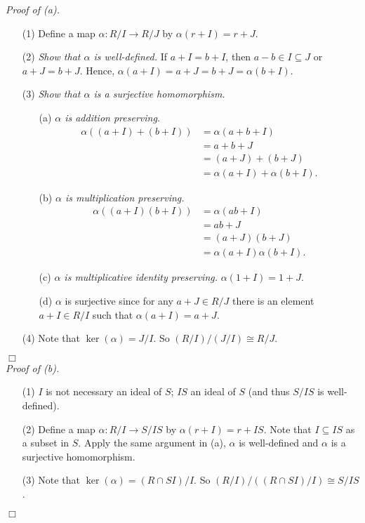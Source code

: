 \documentclass{article}
\begin{document}
\emph{Proof of (a).}
\begin{enumerate}
\item[(1)]
  Define a map $\alpha: R/I \to R/J$ by $\alpha(r + I) = r + J$.

\item[(2)]
  \emph{Show that $\alpha$ is well-defined.}
  If $a+I = b+I$,
  then $a-b \in I \subseteq J$ or $a+J = b+J$.
  Hence, $\alpha(a+I) = a+J = b+J = \alpha(b+I)$.

\item[(3)]
  \emph{Show that $\alpha$ is a surjective homomorphism.}
  \begin{enumerate}
  \item[(a)]
    \emph{$\alpha$ is addition preserving.}
    \begin{align*}
      \alpha((a+I) + (b+I))
      &= \alpha(a+b + I) \\
      &= a+b + J \\
      &= (a+J) + (b+J) \\
      &= \alpha(a+I) + \alpha(b+I).
    \end{align*}

  \item[(b)]
    \emph{$\alpha$ is multiplication preserving.}
    \begin{align*}
      \alpha((a+I)(b+I))
      &= \alpha(ab + I) \\
      &= ab + J \\
      &= (a+J)(b+J) \\
      &= \alpha(a+I)\alpha(b+I).
    \end{align*}

  \item[(c)]
    \emph{$\alpha$ is multiplicative identity preserving.}
    $\alpha(1+I) = 1+J$.

  \item[(d)]
    $\alpha$ is surjective since for any $a+J \in R/J$
    there is an element $a+I \in R/I$ such that $\alpha(a+I) = a+J$.
  \end{enumerate}

\item[(4)]
  Note that $\ker(\alpha) = J/I$. So $(R/I)/(J/I) \cong R/J$.
\end{enumerate}
$\Box$ \\



\emph{Proof of (b).}
\begin{enumerate}
\item[(1)]
  $I$ is not necessary an ideal of $S$; $IS$ an ideal of $S$ (and thus $S/IS$ is well-defined).

\item[(2)]
  Define a map $\alpha: R/I \to S/IS$ by $\alpha(r + I) = r + IS$.
  Note that $I \subseteq IS$ as a subset in $S$.
  Apply the same argument in (a),
  $\alpha$ is well-defined
  and $\alpha$ is a surjective homomorphism.

\item[(3)]
    Note that $\ker(\alpha) = (R \cap SI)/I$.
    So $(R/I)/((R \cap SI)/I) \cong S/IS$.
\end{enumerate}
$\Box$ \\\\
\end{document}
